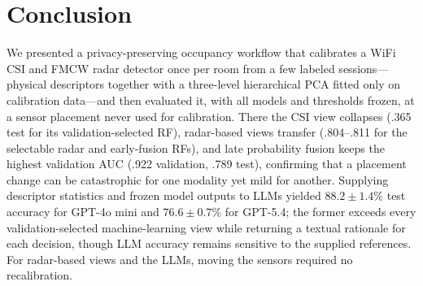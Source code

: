 \documentclass[conference,10pt,letterpaper]{IEEEtran}
\begin{document}
\section{Conclusion}\label{sec:conclusion}
We presented a privacy-preserving occupancy workflow that calibrates a WiFi CSI and FMCW radar detector once per room from a few labeled sessions---physical descriptors together with a three-level hierarchical PCA fitted only on calibration data---and then evaluated it, with all models and thresholds frozen, at a sensor placement never used for calibration. There the CSI view collapses (.365 test for its validation-selected RF), radar-based views transfer (.804--.811 for the selectable radar and early-fusion RFs), and late probability fusion keeps the highest validation AUC (.922 validation, .789 test), confirming that a placement change can be catastrophic for one modality yet mild for another. Supplying descriptor statistics and frozen model outputs to LLMs yielded $88.2\pm1.4$\% test accuracy for GPT-4o mini and $76.6\pm0.7$\% for GPT-5.4; the former exceeds every validation-selected machine-learning view while returning a textual rationale for each decision, though LLM accuracy remains sensitive to the supplied references. For radar-based views and the LLMs, moving the sensors required no recalibration. 



\end{document}
